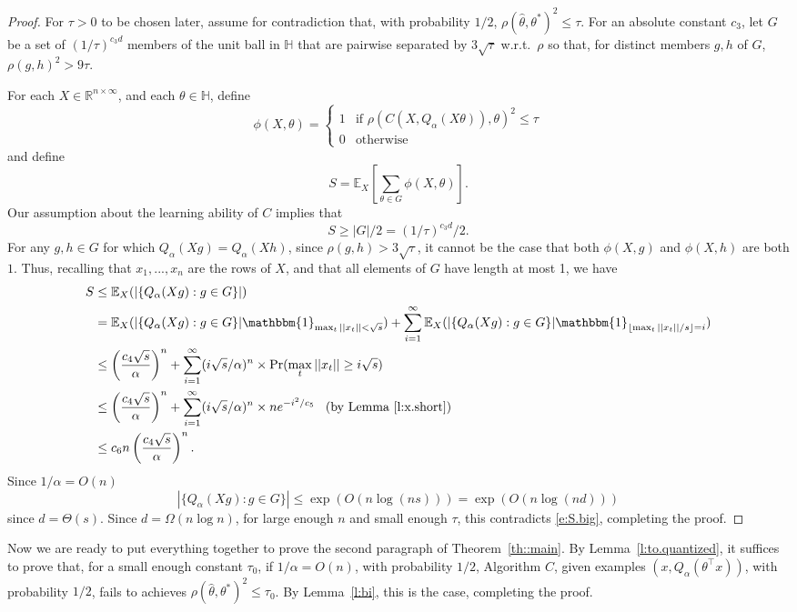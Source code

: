 \documentclass[11pt,notitlepage]{article}
\newcommand\bbH{\mathbb{H}}
\newcommand{\htheta}{\hat{\theta}}
\newcommand{\floor}[1]{\left\lfloor #1 \right\rfloor}
\newcommand\E {\mathbb{E}}
\newcommand\R {\mathbb{R}}
\newcommand\ind {\mathbbm{1}}
\begin{document}
\begin{proof}
For $\tau > 0$ to be chosen later,
assume for contradiction that, with probability
$1/2$, $\rho(\htheta, \theta^*)^2 \leq \tau$.
For an absolute constant $c_3$, let $G$ be a set
of $(1/\tau)^{ c_3 d}$ members of the unit ball in $\bbH$ that
are pairwise separated by $3 \sqrt{\tau}$ w.r.t.\ $\rho$
so that, for distinct members $g,h$ of $G$,
$\rho(g,h)^2 > 9 \tau$.  

For each $X \in \R^{n \times \infty}$, and each 
$\theta \in \bbH$, define
\[
\phi(X, \theta)
 = 
 \left\{ \begin{array}{ll}
    1 & \mbox{if $\rho(C(X, Q_{\alpha} (X \theta)),\theta)^2 \leq \tau$} \\
    0 & \mbox{otherwise}
          \end{array}
     \right.
\]
and define
\[
S = \E_X \left[
      \sum_{\theta \in G}
      \phi(X, \theta)
    \right].
\]
Our assumption about the learning ability of $C$ implies that
\begin{equation}
\label{e:S.big}
S \geq |G|/2 = (1/\tau)^{c_3 d}/2.  
\end{equation}
For any $g,h \in G$
for which $Q_{\alpha} (X g) = Q_{\alpha} (X h)$,
since $\rho(g,h) > 3 \sqrt{\tau}$, it cannot be the
case that both $\phi(X, g)$ and $\phi(X,h)$ are both
$1$.  Thus, recalling that $x_1,...,x_n$ are the
rows of $X$, and that all elements of $G$ have length
at most 1, we have
\begin{align*}
S  & \leq \E_X (| \{ Q_{\alpha} (X g): g \in G \}|) \\
 & = \E_X (| \{ Q_{\alpha} (X g): g \in G \}| 
               \ind_{\max_t || x_t || < \sqrt{s}})  
           + \sum_{i = 1}^{\infty}
          \E_X (| \{ Q_{\alpha} (X g): g \in G \}| 
                 \ind_{\floor{\max_t || x_t ||/s} = i}) \\
 & \leq \left( \frac{c_4 \sqrt{s}}{\alpha} \right)^n
           + \sum_{i = 1}^{\infty}
         (i\sqrt{s}/\alpha)^n \times \Pr(\max_t || x_t || \geq i \sqrt{s}) \\
 & \leq \left( \frac{c_4 \sqrt{s}}{\alpha} \right)^n
           + \sum_{i = 1}^{\infty}
         (i\sqrt{s}/\alpha)^n \times 
       n e^{-i^2/c_5}
     \;\;\;\mbox{(by Lemma~\ref{l:x.short})} \\
 & \leq c_6 n \left( \frac{c_4 \sqrt{s}}{\alpha} \right)^n.
\end{align*}
Since $1/\alpha = O(n)$
\[
|\{ Q_{\alpha} (X g): g \in G \}|
 \leq \exp( O(n \log (n s)) )
 = \exp( O(n \log (n d)) )
\]
since $d = \Theta(s)$.  Since $d = \Omega(n \log n)$,
for large enough $n$ and small enough $\tau$, this
contradicts \eqref{e:S.big}, completing the proof.
\end{proof}

Now we are ready to put everything together to prove
the second paragraph of Theorem~\ref{th::main}.
By Lemma~\ref{l:to.quantized}, it suffices to
prove that, for a small enough constant $\tau_0$,
if $1/\alpha = O(n)$, with probability
$1/2$, Algorithm $C$, given examples 
$(x,Q_{\alpha}(\theta^{\top} x))$, 
with probability $1/2$, fails to
achieves $\rho(\htheta, \theta^*)^2 \leq \tau_0$.
By Lemma~\ref{l:bi}, this is the case, completing the
proof.
\end{document}
